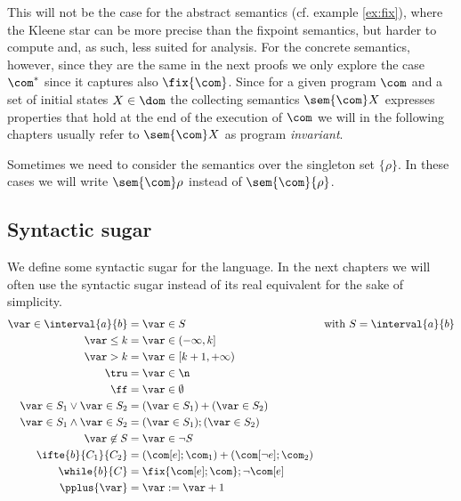 This will not be the case for the abstract semantics (cf. example
\ref{ex:fix}), where the Kleene star can be more precise than the
fixpoint semantics, but harder to compute and, as such, less suited
for analysis. For the concrete semantics, however, since they are the
same in the next proofs we only explore the case \(\com^*\) since it
captures also \(\fix{\com}\). Since for a given program \(\com\) and a
set of initial states \(X \in \dom\) the collecting semantics
\(\sem{\com}X\) expresses properties that hold at the end of the
execution of \(\com\) we will in the following chapters usually refer
to \(\sem{\com}X\) as program \emph{invariant}.

\begin{notation}
  Sometimes we need to consider the semantics over the singleton set
  \(\{\rho\}\). In these cases we will write \(\sem{\com}\rho\)
  instead of \(\sem{\com}\{\rho\}\).
\end{notation}


\subsection{Syntactic sugar}\label{sub:sugar}
We define some syntactic sugar for the language. In the next chapters
we will often use the syntactic sugar instead of its real equivalent
for the sake of simplicity.
\begin{align*}
  \var \in \interval{a}{b} & = \var \in S & \text{with } S = \interval{a}{b}\\
  \var \leq k & = \var \in (-\infty, k]\\
  \var > k & = \var \in [k+1, + \infty) \\
  \tru & = \var \in \n \\
  \ff & = \var \in \emptyset \\
  \var \in S_1 \vee \var \in S_2 & = (\var \in S_1) + (\var \in S_2) \\ 
  \var \in S_1 \wedge \var \in S_2 & = (\var \in S_1);(\var \in S_2) \\
  \var \not\in S & = \var \in \neg S \\
  \ifte{b}{C_1}{C_2} & = (\com[e];\com_1) + (\com[\neg e];\com_2) \\
  \while{b}{C} & = \fix{\com[e];\com};\neg\com[e] \\
  \pplus{\var} & = \var := \var + 1
\end{align*}

